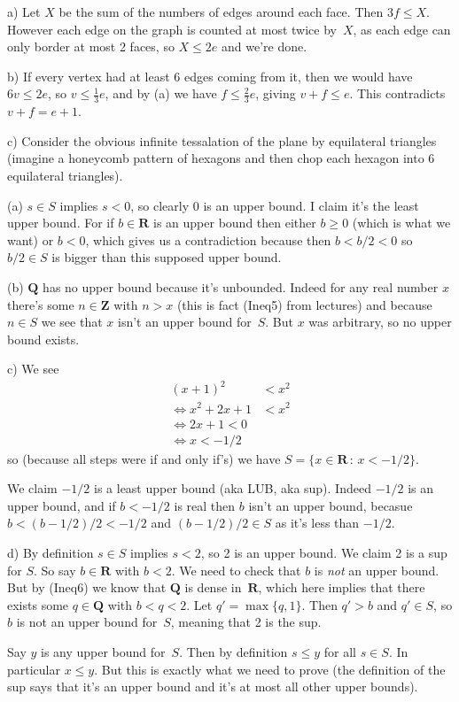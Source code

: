 \documentclass[10pt]{article}
\newcommand{\R}{\mathbf{R}}
\newcommand{\Q}{\mathbf{Q}}
\newcommand{\Z}{\mathbf{Z}}
\begin{document}
a) Let $X$ be the sum of the numbers of edges around each face. Then $3f\leq X$. However each edge on the graph is counted at most twice by~$X$, as each edge can only border at most 2 faces, so $X\leq 2e$ and we're done.

b) If every vertex had at least 6 edges coming from it, then we would have $6v\leq 2e$, so $v\leq \frac{1}{3}e$, and by (a) we have $f\leq\frac{2}{3}e$, giving $v+f\leq e$. This contradicts $v+f=e+1$.

c) Consider the obvious infinite tessalation of the plane by equilateral triangles (imagine a honeycomb pattern of hexagons and then chop each hexagon into 6 equilateral triangles).

\medskip{} 

(a) $s\in S$ implies $s<0$, so clearly 0 is an upper bound. I claim it's the least upper bound. For if $b\in\R$ is an upper bound then either $b\geq0$ (which is what we want) or $b<0$, which gives us a contradiction because then $b<b/2<0$ so $b/2\in S$ is bigger than this supposed upper bound.

(b) $\Q$ has no upper bound because it's unbounded. Indeed for any real number $x$ there's some $n\in\Z$ with $n>x$ (this is fact (Ineq5) from lectures) and because $n\in S$ we see that $x$ isn't an upper bound for~$S$. But $x$ was arbitrary, so no upper bound exists.

c) We see
\begin{align*}
(x+1)^2&<x^2\\
\iff x^2+2x+1&<x^2\\
\iff 2x+1<0\\
\iff x<-1/2
\end{align*}
so (because all steps were if and only if's) we have $S=\{x\in\R\,:\,x<-1/2\}$.

We claim $-1/2$ is a least upper bound (aka LUB, aka sup). Indeed $-1/2$ is an upper bound, and if $b<-1/2$ is real then $b$ isn't an upper bound, becasue $b<(b-1/2)/2<-1/2$ and $(b-1/2)/2\in S$ as it's less than $-1/2$.

d) By definition $s\in S$ implies $s<2$, so 2 is an upper bound. We claim 2 is a sup for $S$. So say $b\in\R$ with $b<2$. We need to check that $b$ is \emph{not} an upper bound. But by (Ineq6) we know that $\Q$ is dense in~$\R$, which here implies that there exists some $q\in\Q$ with $b<q<2$. Let $q'=\max\{q,1\}$. Then $q'>b$ and $q'\in S$, so $b$ is not an upper bound for~$S$, meaning that 2 is the sup.

\medskip{} Say $y$ is any upper bound for~$S$. Then by definition $s\leq y$ for all $s\in S$. In particular $x\leq y$. But this is exactly what we need to prove (the definition of the sup says that it's an upper bound and it's at most all other upper bounds).
\end{document}
